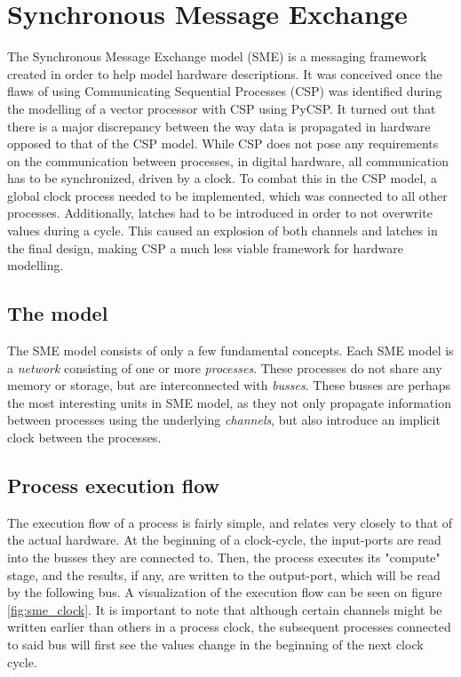 \section{Synchronous Message Exchange} The Synchronous Message Exchange
model (SME) is a messaging framework created in order to help model
hardware descriptions\cite{sme_for_hardware_designs}.  It was conceived
once the flaws of using Communicating Sequential Processes (CSP) was
identified during the modelling of a vector processor with CSP using
PyCSP\cite{PyCSP}.  It turned out that there is a major discrepancy
between the way data is propagated in hardware opposed to that of the
CSP model. While CSP does not pose any requirements on the communication
between processes, in digital hardware, all communication has to be
synchronized, driven by a clock. To combat this in the CSP model, a
global clock process needed to be implemented, which was connected to
all other processes. Additionally, latches had to be introduced in order
to not overwrite values during a cycle. This caused an explosion of both
channels and latches in the final design, making CSP a much less viable
framework for hardware modelling\cite{sme_for_hardware_designs}.

\subsection{The model} The SME model consists of only a few fundamental
concepts. Each SME model is a \textit{network} consisting of one or more
\textit{processes}. These processes do not share any memory or storage,
but are interconnected with \textit{busses}.  These busses are perhaps
the most interesting units in SME model, as they not only propagate
information between processes using the underlying \textit{channels},
but also introduce an implicit clock between the processes.\\

\subsection{Process execution flow} The execution flow of a process is
fairly simple, and relates very closely to that of the actual hardware. At
the beginning of a clock-cycle, the input-ports are read into the busses
they are connected to. Then, the process executes its "compute" stage, and
the results, if any, are written to the output-port, which will be read
by the following bus. A visualization of the execution flow can be seen
on figure \ref{fig:sme_clock}.  
It is important to note that although certain channels might be written earlier
than others in a process clock, the subsequent processes connected to said bus 
will first see the values change in the beginning of the next clock cycle.


